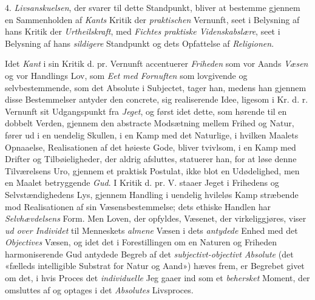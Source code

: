 4. \emph{Livsanskuelsen}, der svarer til dette Standpunkt,
bliver at bestemme gjennem en Sammenholden af \emph{Kants}
Kritik der \emph{praktischen} Vernunft, seet i Belysning af hans
Kritik der \emph{Urtheilskraft}, med \emph{Fichtes praktiske Videnskabslære},
seet i Belysning af hans \emph{sildigere} Standpunkt
og dets Opfattelse af \emph{Religionen}.

Idet \emph{Kant} i sin Kritik d. pr. Vernunft accentuerer \emph{Friheden}
som vor Aands \emph{Væsen} og vor Handlings Lov, som
\emph{Eet med Fornuften} som lovgivende og selvbestemmende,
som det Absolute i Subjectet, tager han, medens han gjennem
 disse Bestemmelser antyder den concrete, sig realiserende Idee,
ligesom i Kr. d. r. Vernunft sit Udgangspunkt fra \emph{Jeget}, og
først idet dette, som hørende til en dobbelt Verden, gjennem
den abstracte Modsætning mellem Frihed og Natur, fører ud
i en uendelig Skullen, i en Kamp med det Naturlige, i hvilken
Maalets Opnaaelse, Realisationen af det høieste Gode,
bliver tvivlsom, i en Kamp med Drifter og Tilbøieligheder,
der aldrig afsluttes, statuerer han, for at løse denne Tilværelsens
Uro, gjennem et praktisk Postulat, ikke blot en Udødelighed,
men en Maalet betryggende \emph{Gud}. I Kritik d. pr. V.
staaer Jeget i Frihedens og Selvstændighedens Lys, gjennem
Handling i uendelig hvileløs Kamp stræbende mod Realisationen
af sin Væsensbestemmelse; dets ethiske Handlen har \emph{Selvhævdelsens}
Form. Men Loven, der opfyldes, Væsenet, der
virkeliggjøres, viser \emph{ud over Individet} til Menneskets \emph{almene}
Væsen i dets \emph{antydede} Enhed med det \emph{Objectives}
Væsen, og idet det i Forestillingen om en Naturen og Friheden
harmoniserende Gud antydede Begreb af det \emph{subjectivt-objectivt
Absolute} (det «fælleds intelligible Substrat for
Natur og Aand») hæves frem, er Begrebet givet om det, i
hvis Proces det \emph{individuelle} Jeg gaaer ind som et \emph{behersket}
Moment, der omsluttes af og optages i det \emph{Absolutes}
Livsproces.

